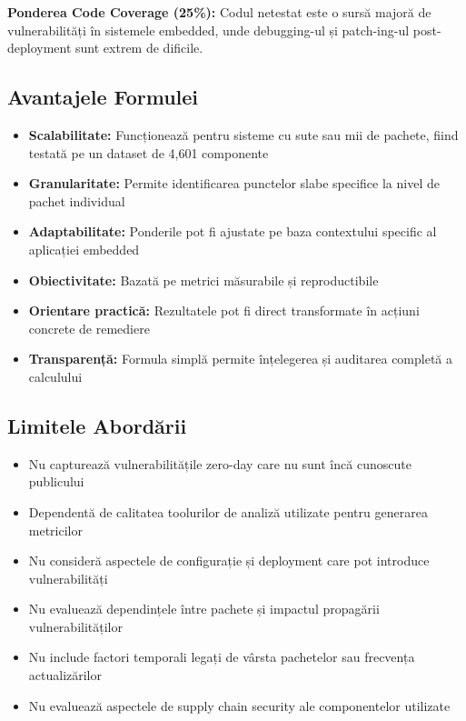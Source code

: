 \documentclass[12pt,a4paper]{article}
\begin{document}
\textbf{Ponderea Code Coverage (25\%):} Codul netestat este o sursă majoră de vulnerabilități în sistemele embedded, unde debugging-ul și patch-ing-ul post-deployment sunt extrem de dificile.

\subsection{Avantajele Formulei}

\begin{itemize}
\item \textbf{Scalabilitate:} Funcționează pentru sisteme cu sute sau mii de pachete, fiind testată pe un dataset de 4,601 componente
\item \textbf{Granularitate:} Permite identificarea punctelor slabe specifice la nivel de pachet individual
\item \textbf{Adaptabilitate:} Ponderile pot fi ajustate pe baza contextului specific al aplicației embedded
\item \textbf{Obiectivitate:} Bazată pe metrici măsurabile și reproductibile
\item \textbf{Orientare practică:} Rezultatele pot fi direct transformate în acțiuni concrete de remediere
\item \textbf{Transparență:} Formula simplă permite înțelegerea și auditarea completă a calculului
\end{itemize}

\subsection{Limitele Abordării}

\begin{itemize}
\item Nu capturează vulnerabilitățile zero-day care nu sunt încă cunoscute publicului
\item Dependentă de calitatea toolurilor de analiză utilizate pentru generarea metricilor
\item Nu consideră aspectele de configurație și deployment care pot introduce vulnerabilități
\item Nu evaluează dependințele între pachete și impactul propagării vulnerabilităților
\item Nu include factori temporali legați de vârsta pachetelor sau frecvența actualizărilor
\item Nu evaluează aspectele de supply chain security ale componentelor utilizate
\end{itemize}
\end{document}
